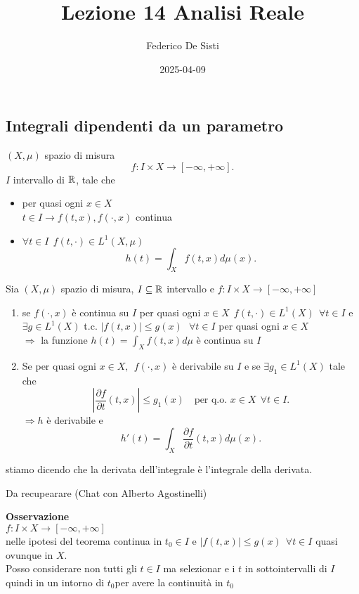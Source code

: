 \documentclass[12px]{article}
\title{Lezione 14 Analisi Reale}
\date{2025-04-09}
\author{Federico De Sisti}
\begin{document}
	\maketitle
	\newpage
	\subsection{Integrali dipendenti da un parametro}
		$(X,\mu)$ spazio di misura
		 \[
			 f : I\times X \rightarrow [-\infty,+\infty]
		.\] 
		$I$ intervallo di $\mathbb{R}$, tale che 
		 \begin{itemize}
			 \item per quasi ogni $x\in X$\\
				  $t\in I \rightarrow f(t,x), f(\cdot, x)$ continua
			  \item $\forall t\in I\ \ f(t,\cdot)\in L^1(X,\mu)$
				   \[
				  h(t) = \int_Xf(t,x)d\mu(x)
				  .\] 
		\end{itemize}
		\begin{teo}
			Sia $(X,\mu)$ spazio di misura, $I\subseteq \mathbb{R}$ intervallo e $f: I\times X \rightarrow [-\infty, +\infty]$
			\begin{enumerate}
				\item se  $f(\cdot,x)$ è continua su  $I$ per quasi ogni $x\in X\ \ f(t,\cdot)\in L^1(X)\ \ \forall t\in I$  e  $\exists g\in L^1(X)$ t.c.  $|f(t,x)|\leq g(x) \ \ \ \forall t\in I$ per quasi ogni  $x\in X$\\
			 $ \Rightarrow  $ la funzione $h(t) = \int_Xf(t,x)d\mu$ è continua su $I$
		 \item Se per quasi ogni $x\in X, \ \ f(\cdot, x)$ è derivabile su $I$ e se $\exists g_1\in L^1(X)$ tale che 
			 \[
				 |\frac{\partial f}{\partial t}(t,x)|\leq g_1(x)\ \ \ \text{ per q.o. }x\in X\ \ \forall t\in I
			 .\] 
			 $ \Rightarrow h$ è derivabile e 
			 \[
				 h'(t) = \int_X\frac{\partial f}{\partial t}(t,x)d\mu(x)
			 .\] 
			\end{enumerate}
			stiamo dicendo che la derivata dell'integrale è l'integrale della derivata.
		\end{teo}
		\begin{dimo}
			Da recupearare (Chat con Alberto Agostinelli)
		\end{dimo}
		\textbf{Osservazione}\\
		$f: I\times X \rightarrow [-\infty, +\infty]$ \\
		nelle ipotesi del teorema continua in $t_0\in I$ e  $|f(t,x)| \leq g(x) \ \ \forall t\in I$ quasi ovunque in  $X$.\\
		Posso considerare non tutti gli  $t\in I$ ma selezionar e i $t$ in sottointervalli di $I$ quindi in un intorno di $t_0$per avere la continuità in $ t_0$\\
\end{document}
